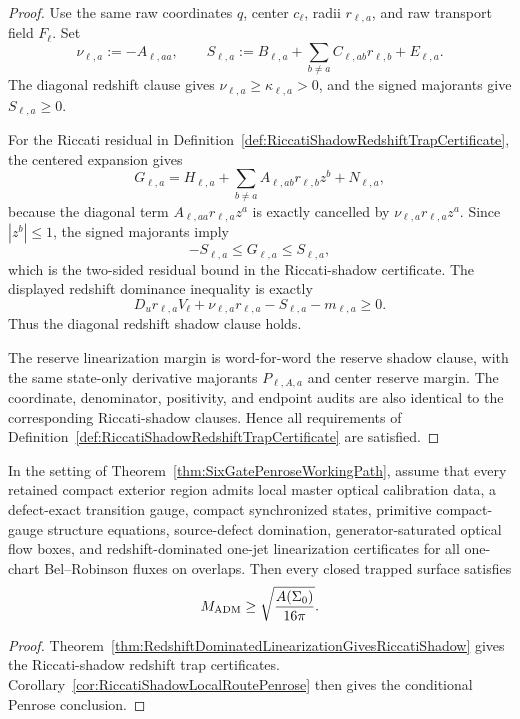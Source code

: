 \begin{proof}
Use the same raw coordinates $q$, center $c_\ell$, radii $r_{\ell,a}$, and raw
transport field $F_\ell$.  Set
\[
    \nu_{\ell,a}:=-A_{\ell,aa},
    \qquad
    S_{\ell,a}
    :=
    B_{\ell,a}
    +\sum_{b\ne a}C_{\ell,ab}r_{\ell,b}
    +E_{\ell,a}.
\]
The diagonal redshift clause gives $\nu_{\ell,a}\ge\kappa_{\ell,a}>0$, and the
signed majorants give $S_{\ell,a}\ge0$.

For the Riccati residual in
Definition~\ref{def:RiccatiShadowRedshiftTrapCertificate}, the centered
expansion gives
\[
    G_{\ell,a}
    =
    H_{\ell,a}
    +\sum_{b\ne a}A_{\ell,ab}r_{\ell,b}z^b
    +N_{\ell,a},
\]
because the diagonal term $A_{\ell,aa}r_{\ell,a}z^a$ is exactly cancelled by
$\nu_{\ell,a}r_{\ell,a}z^a$.  Since $|z^b|\le1$, the signed majorants imply
\[
    -S_{\ell,a}\le G_{\ell,a}\le S_{\ell,a},
\]
which is the two-sided residual bound in the Riccati-shadow certificate.
The displayed redshift dominance inequality is exactly
\[
    D_ur_{\ell,a}V_\ell
    +\nu_{\ell,a}r_{\ell,a}
    -S_{\ell,a}
    -m_{\ell,a}
    \ge0 .
\]
Thus the diagonal redshift shadow clause holds.

The reserve linearization margin is word-for-word the reserve shadow clause,
with the same state-only derivative majorants $P_{\ell,A,a}$ and center
reserve margin.  The coordinate, denominator, positivity, and endpoint audits
are also identical to the corresponding Riccati-shadow clauses.  Hence all
requirements of
Definition~\ref{def:RiccatiShadowRedshiftTrapCertificate} are satisfied.
\end{proof}

\begin{corollary}\label{cor:DominatedLinearizationLocalRoutePenrose}
In the setting of Theorem~\ref{thm:SixGatePenroseWorkingPath}, assume that
every retained compact exterior region admits local master optical calibration
data, a defect-exact transition gauge, compact synchronized states, primitive
compact-gauge structure equations, source-defect domination,
generator-saturated optical flow boxes, and redshift-dominated one-jet
linearization certificates for all one-chart Bel--Robinson fluxes on overlaps.
Then every closed trapped surface satisfies
\[
    M_{\mathrm{ADM}}\ge \sqrt{\frac{A(\Sigma_0)}{16\pi}} .
\]
\end{corollary}

\begin{proof}
Theorem~\ref{thm:RedshiftDominatedLinearizationGivesRiccatiShadow} gives the
Riccati-shadow redshift trap certificates.  Corollary~\ref{cor:RiccatiShadowLocalRoutePenrose}
then gives the conditional Penrose conclusion.
\end{proof}

